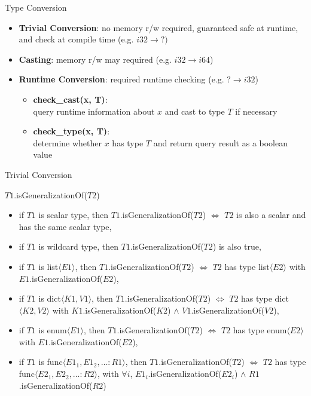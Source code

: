 \documentclass{beamer}
\begin{document}
\begin{frame}{Type Conversion}
\begin{itemize}
    \item \textbf{Trivial Conversion}: no memory r/w required, guaranteed safe
          at runtime, and check at compile time (e.g. $i32 \rightarrow ?)$
    \item \textbf{Casting}: memory r/w may required (e.g. $i32 \rightarrow
          i64$)
    \item \textbf{Runtime Conversion}: required runtime checking (e.g. $?
          \rightarrow i32$)
          \begin{itemize}
          \item \textbf{check\_cast(x, T)}: \\ query runtime information about
                $x$ and cast to type $T$ if necessary
          \item \textbf{check\_type(x, T)}: \\ determine whether $x$ has type
                $T$ and return query result as a boolean value
          \end{itemize}
\end{itemize}
\end{frame}

\begin{frame}{Trivial Conversion}
\begin{block}{$T1$.isGeneralizationOf($T2$)}
\begin{itemize}
    \item if $T1$ is scalar type, then $T1$.isGeneralizationOf($T2$)
          $\iff$ $T2$ is also a scalar and has the same scalar type,
    \item if $T1$ is wildcard type, then $T1$.isGeneralizationOf($T2$)
          is also true,
    \item if $T1$ is list$\langle E1 \rangle$, then
          $T1$.isGeneralizationOf($T2$) $\iff$ $T2$ has type
          list$\langle E2 \rangle$ with $E1$.isGeneralizationOf($E2$),
    \item if $T1$ is dict$\langle K1,V1 \rangle$, then 
          $T1$.isGeneralizationOf($T2$) $\iff$ $T2$ has type
          dict$\langle K2, V2 \rangle$ with $K1$.isGeneralizationOf($K2$)
          $\land$ $V1$.isGeneralizationOf($V2$),
    \item if $T1$ is enum$\langle E1 \rangle$, then
          $T1$.isGeneralizationOf($T2$) $\iff$ $T2$ has type
          enum$\langle E2 \rangle$ with $E1$.isGeneralizationOf($E2$),
    \item if $T1$ is func$\langle E1_1, E1_2, \dots :R1 \rangle$, then 
          $T1$.isGeneralizationOf($T2$) $\iff$ $T2$ has type 
          func$\langle E2_1, E2_2, \dots :R2 \rangle$, with $\forall i$, 
          $E1_i$.isGeneralizationOf($E2_i$) $\land$ 
          $R1$.isGeneralizationOf($R2$)
\end{itemize}
\end{block}
\end{frame}
\end{document}
